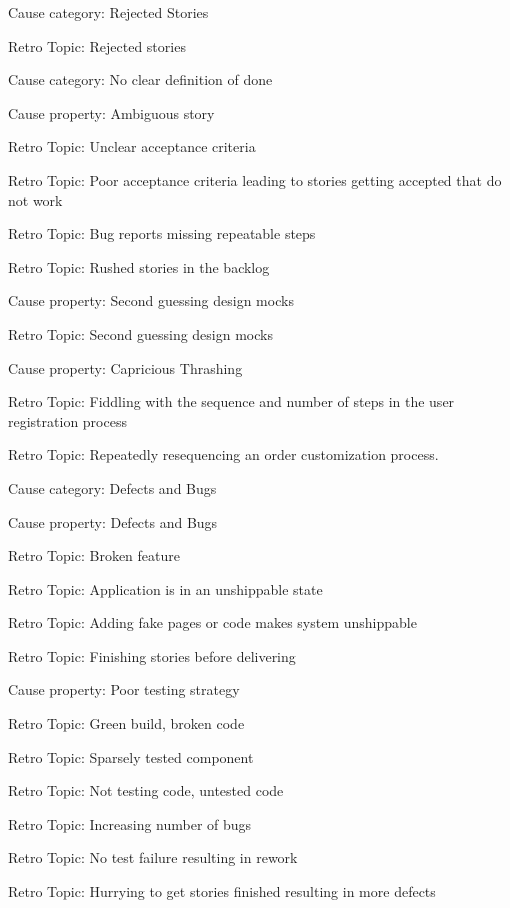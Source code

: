 \quad Cause category: Rejected Stories

\quad \quad Retro Topic: Rejected stories

\quad Cause category: No clear definition of done

\quad \quad Cause property: Ambiguous story

\quad \quad \quad Retro Topic: Unclear acceptance criteria

\quad \quad \quad Retro Topic: Poor acceptance criteria leading to stories getting accepted that do not work

\quad \quad \quad Retro Topic: Bug reports missing repeatable steps

\quad \quad \quad Retro Topic: Rushed stories in the backlog

\quad \quad Cause property: Second guessing design mocks

\quad \quad \quad Retro Topic: Second guessing design mocks

\quad \quad Cause property: Capricious Thrashing

\quad \quad \quad Retro Topic: Fiddling with the sequence and number of steps in the user registration process

\quad \quad \quad Retro Topic: Repeatedly resequencing an order customization process.

\quad Cause category: Defects and Bugs

\quad \quad Cause property: Defects and Bugs

\quad \quad \quad Retro Topic: Broken feature

\quad \quad \quad Retro Topic: Application is in an unshippable state

\quad \quad \quad Retro Topic: Adding fake pages or code makes system unshippable

\quad \quad \quad Retro Topic: Finishing stories before delivering

\quad \quad Cause property: Poor testing strategy

\quad \quad \quad Retro Topic: Green build, broken code

\quad \quad \quad Retro Topic: Sparsely tested component

\quad \quad \quad Retro Topic: Not testing code, untested code

\quad \quad \quad Retro Topic: Increasing number of bugs

\quad \quad \quad Retro Topic: No test failure resulting in rework

\quad \quad \quad Retro Topic: Hurrying to get stories finished resulting in more defects

